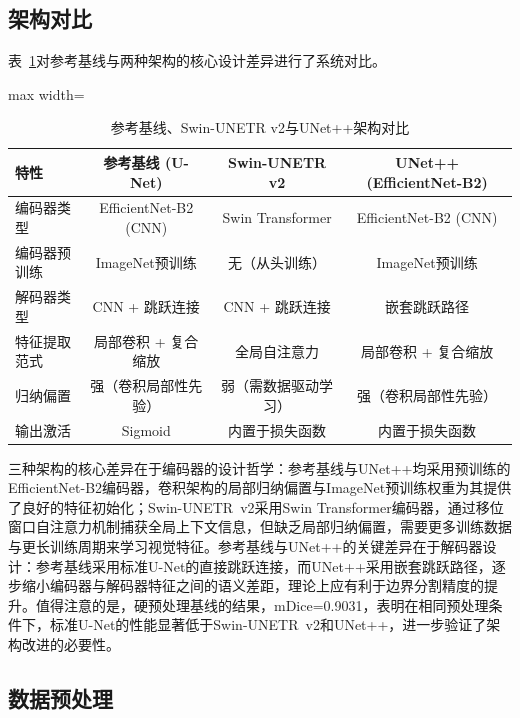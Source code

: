 \documentclass[12pt, a4paper]{article}
\begin{document}
\subsection{架构对比}
\label{sec:arch_compare}

表~\ref{tab:arch_compare}对参考基线与两种架构的核心设计差异进行了系统对比。

\begin{table}[H]
    \centering
    \caption{参考基线、Swin-UNETR v2与UNet++架构对比}
    \label{tab:arch_compare}
    \begin{adjustbox}{max width=\textwidth}
    \begin{tabular}{@{}lccc@{}}
        \toprule
        \textbf{特性} & \textbf{参考基线 (U-Net)} & \textbf{Swin-UNETR v2} & \textbf{UNet++ (EfficientNet-B2)} \\
        \midrule
        编码器类型 & EfficientNet-B2 (CNN) & Swin Transformer & EfficientNet-B2 (CNN) \\
        编码器预训练 & ImageNet预训练 & 无（从头训练） & ImageNet预训练 \\
        解码器类型 & CNN + 跳跃连接 & CNN + 跳跃连接 & 嵌套跳跃路径 \\
        特征提取范式 & 局部卷积 + 复合缩放 & 全局自注意力 & 局部卷积 + 复合缩放 \\
        归纳偏置 & 强（卷积局部性先验） & 弱（需数据驱动学习） & 强（卷积局部性先验） \\
        输出激活 & Sigmoid & 内置于损失函数 & 内置于损失函数 \\
        \bottomrule
    \end{tabular}
    \end{adjustbox}
\end{table}

三种架构的核心差异在于编码器的设计哲学：参考基线与UNet++均采用预训练的EfficientNet-B2编码器，卷积架构的局部归纳偏置与ImageNet预训练权重为其提供了良好的特征初始化；Swin-UNETR~v2采用Swin Transformer编码器，通过移位窗口自注意力机制捕获全局上下文信息，但缺乏局部归纳偏置，需要更多训练数据与更长训练周期来学习视觉特征。参考基线与UNet++的关键差异在于解码器设计：参考基线采用标准U-Net的直接跳跃连接，而UNet++采用嵌套跳跃路径，逐步缩小编码器与解码器特征之间的语义差距，理论上应有利于边界分割精度的提升。值得注意的是，硬预处理基线的结果，mDice=0.9031，表明在相同预处理条件下，标准U-Net的性能显著低于Swin-UNETR~v2和UNet++，进一步验证了架构改进的必要性。

\subsection{数据预处理}
\label{sec:preprocess}
\end{document}
